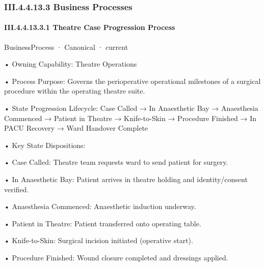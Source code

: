 \subsubsection*{III.4.4.13.3 Business Processes}
\label{navigation:III.4.4.13.3}

\paragraph*{III.4.4.13.3.1 Theatre Case Progression Process}
\label{navigation:III.4.4.13.3.1}

\label{element:8ad97120b5b54a31a64a4522e6bc9fd1}
{\small BusinessProcess · Canonical · current}\par

•
Owning Capability: Theatre Operations



•
Process Purpose: Governs the perioperative operational milestones of a surgical procedure within the operating theatre suite.



•
State Progression Lifecycle: Case Called → In Anaesthetic Bay → Anaesthesia Commenced → Patient in Theatre → Knife-to-Skin → Procedure Finished → In PACU Recovery → Ward Handover Complete



•
Key State Dispositions:



•
Case Called: Theatre team requests ward to send patient for surgery.



•
In Anaesthetic Bay: Patient arrives in theatre holding and identity/consent verified.



•
Anaesthesia Commenced: Anaesthetic induction underway.



•
Patient in Theatre: Patient transferred onto operating table.



•
Knife-to-Skin: Surgical incision initiated (operative start).



•
Procedure Finished: Wound closure completed and dressings applied.




